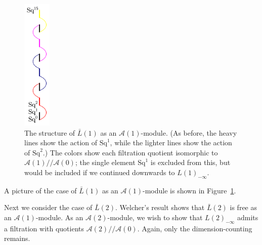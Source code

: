 \documentclass{article}
\newcommand{\A}{\mathcal{A}}
\newcommand{\Sq}{\mathrm{Sq}}
\newcommand{\mmod}{/\!/\!}
\renewcommand{\L}{\bar{L}}
\newcommand{\Lkm}[1][k]{L{(#1)}_{-\infty}}
\begin{document}
\begin{figure}
  \begin{center}
    \includegraphics[height=2.5in]{pics/L1-1.pdf}
  \end{center}
  \caption{The structure of $\L(1)$ as an $\A(1)$-module.  (As before, the heavy lines show the action of $\Sq^1$, while the lighter lines show the action of $\Sq^2$.)  The colors show each filtration quotient isomorphic to $\A(1)\mmod\A(0)$; the single element $\Sq^1$ is excluded from this, but would be included if we continued downwards to $\Lkm[1]$. \label{fig:L1-1}}
\end{figure}

A picture of the case of $\L(1)$ as an $\A(1)$-module is shown in Figure~\ref{fig:L1-1}.

Next we consider the case of $\L(2)$.  Welcher's result shows that $\L(2)$ is free as an $\A(1)$-module.  As an $\A(2)$-module, we wish to show that $\Lkm[2]$ admits a filtration with quotients $\A(2)\mmod\A(0)$.  Again, only the dimension-counting remains.
\end{document}
